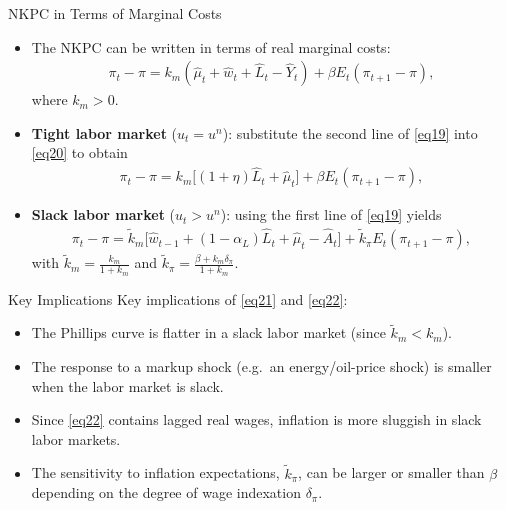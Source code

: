 \documentclass[11pt,aspectratio=169]{beamer}
\begin{document}
\begin{frame}{NKPC in Terms of Marginal Costs}
\small
\begin{itemize}
    \item The NKPC can be written in terms of real marginal costs:
    \begin{align}
        \pi _{t}-\pi
        =k_{m}(\hat{\mu}_{t}+\hat{w}_{t}+\hat{L}_{t}-\hat{Y}_{t})
        +\beta E_{t}(\pi _{t+1}-\pi ),
        \label{eq20}
    \end{align}
    where \(k_m>0\).

    \item \textbf{Tight labor market} (\(u_t=u^n\)): substitute the second line of \eqref{eq19} into \eqref{eq20} to obtain
    \begin{align}
        \pi _{t}-\pi
        =k_{m}\big[(1+\eta )\hat{L}_{t}+\hat{\mu}_{t}\big]
        +\beta E_{t}(\pi_{t+1}-\pi ),
        \label{eq21}
    \end{align}

    \item \textbf{Slack labor market} (\(u_t>u^n\)): using the first line of \eqref{eq19} yields
    \begin{align}
        \pi _{t}-\pi
        =\tilde{k}_{m}\big[\hat{w}_{t-1}+(1-\alpha _{L})\hat{L}_{t}+\hat{\mu}_{t}-\hat{A}_{t}\big]
        +\tilde{k}_{\pi }E_{t}(\pi _{t+1}-\pi ),
        \label{eq22}
    \end{align}
    with \(\tilde{k}_{m}=\frac{k_{m}}{1+k_{m}}\) and \(\tilde{k}_{\pi }=\frac{\beta +k_{m}\delta _{\pi }}{1+k_{m}}\).
\end{itemize}
\end{frame}

\begin{frame}{Key Implications}
\small
Key implications of \eqref{eq21} and \eqref{eq22}:
\begin{itemize}
    \item The Phillips curve is flatter in a slack labor market (since \(\tilde{k}_{m}<k_{m}\)).
    \item The response to a markup shock (e.g.\ an energy/oil-price shock) is smaller when the labor market is slack.
    \item Since \eqref{eq22} contains lagged real wages, inflation is more sluggish in slack labor markets.
    \item The sensitivity to inflation expectations, \(\tilde{k}_\pi\), can be larger or smaller than \(\beta\) depending on the degree of wage indexation \(\delta_\pi\).
\end{itemize}
\end{frame}
\end{document}
